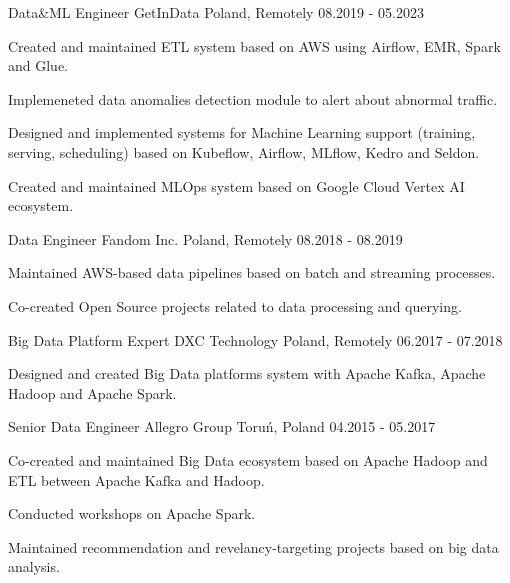 \begin{cventries}
  \cventry
    {Data\&ML Engineer} %
    {GetInData} %
    {Poland, Remotely} %
    {08.2019 - 05.2023} %
    {
      \begin{cvitems} %
        \item {Created and maintained ETL system based on AWS using Airflow, EMR, Spark and Glue.}
        \item {Implemeneted data anomalies detection module to alert about abnormal traffic.}
        \item {Designed and implemented systems for Machine Learning support (training, serving, scheduling) based on Kubeflow, Airflow, MLflow, Kedro and Seldon.}
        \item {Created and maintained MLOps system based on Google Cloud Vertex AI ecosystem.}
      \end{cvitems}
    }

  \cventry
    {Data Engineer} %
    {Fandom Inc.} %
    {Poland, Remotely} %
    {08.2018 - 08.2019} %
    {
      \begin{cvitems} %
        \item {Maintained AWS-based data pipelines based on batch and streaming processes.}
        \item {Co-created Open Source projects related to data processing and querying.}
      \end{cvitems}
    }

  \cventry
    {Big Data Platform Expert} %
    {DXC Technology} %
    {Poland, Remotely} %
    {06.2017 - 07.2018} %
    {
      \begin{cvitems} %
        \item {Designed and created Big Data platforms system with Apache Kafka, Apache Hadoop and Apache Spark.}
      \end{cvitems}
    }

  \cventry
    {Senior Data Engineer} %
    {Allegro Group} %
    {Toruń, Poland} %
    {04.2015 - 05.2017} %
    {
      \begin{cvitems} %
        \item {Co-created and maintained Big Data ecosystem based on Apache Hadoop and ETL between Apache Kafka and Hadoop.}
        \item {Conducted workshops on Apache Spark.}
        \item {Maintained recommendation and revelancy-targeting projects based on big data analysis.}
      \end{cvitems}
    }


\end{cventries}

